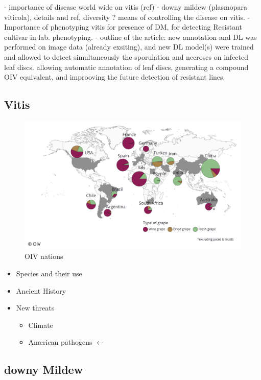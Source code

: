 \documentclass[english]{article}
\begin{document}
- importance of disease world wide on vitis (ref)
- downy mildew (plasmopara viticola), details and ref, diversity ? means of controlling the disease on vitis.
- Importance of phenotyping vitis for presence of DM, for detecting Resistant cultivar in lab. phenotyping.
- outline of the article: new annotation and DL was performed on image data (already exsiting), and new DL model(s) were trained and allowed to detect simultaneously the sporulation and necroses on infected leaf discs. allowing automatic annotation of leaf discs, generating a compound OIV equivalent, and improoving the future  detection of resistant lines.


\subsection{Vitis}

\begin{figure}[H]
	\begin{center}
		\includegraphics[width=0.7\linewidth]{2023_cdt_oiv_world.png}
		\caption{OIV nations}\label{fig:oivworld}
	\end{center}
\end{figure}

\begin{itemize}
    \item Species and their use
    \item Ancient History
    \item New threats
    \begin{itemize}
        \item Climate
        \item American pathogens $\leftarrow$
    \end{itemize}
\end{itemize}

\subsection{downy Mildew}
\end{document}
